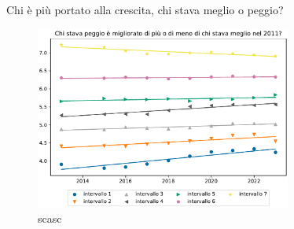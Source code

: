 \documentclass{beamer}
\begin{document}
\begin{frame}{Chi è più portato alla crescita, chi stava meglio o peggio?}
	\begin{figure}
		\centering
		\includegraphics[width=0.75\textwidth]{"./img/7ImmobilismoOVariazioneBenessere.pdf"}
		\caption{scasc}
	\end{figure}
\end{frame}
\end{document}
